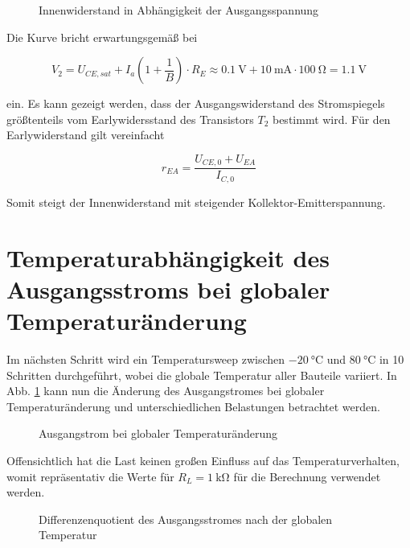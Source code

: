 \begin{figure}[H]
	\centering \small
	\scalebox{0.9}{}
	\caption{Innenwiderstand in Abhängigkeit der Ausgangsspannung}
	\label{fig_Kap4_05:Ri}
\end{figure}

Die Kurve bricht erwartungsgemäß bei 

\begin{equation}
    V_2 = U_{CE,sat} + I_a (1 + \frac{1}{B}) \cdot R_E \approx \SI{0,1}{\volt} + \SI{10}{\milli\ampere} \cdot \SI{100}{\ohm} = \SI{1,1}{\volt}
\end{equation}

ein. Es kann gezeigt werden, dass der Ausgangswiderstand des Stromspiegels größtenteils vom Earlywidersstand des Transistors $T_2$ bestimmt wird. Für den Earlywiderstand gilt vereinfacht

\begin{equation}
    r_{EA} = \frac{U_{CE,0} + U_{EA}}{I_{C,0}}
\end{equation}

Somit steigt der Innenwiderstand mit steigender Kollektor-Emitterspannung.

\section{Temperaturabhängigkeit des Ausgangsstroms bei globaler Temperaturänderung}
Im nächsten Schritt wird ein Temperatursweep zwischen $\SI{-20}{\celsius}$ und $\SI{80}{\celsius}$ in 10 Schritten durchgeführt, wobei die globale Temperatur aller Bauteile variiert. In Abb. \ref{} kann nun die Änderung des Ausgangstromes bei globaler Temperaturänderung und unterschiedlichen Belastungen betrachtet werden. 

\begin{figure}[H]
	\centering \small
	\scalebox{0.9}{}
	\caption{Ausgangstrom bei globaler Temperaturänderung}
	\label{fig_Kap4_06:T_1}
\end{figure}

Offensichtlich hat die Last keinen großen Einfluss auf das Temperaturverhalten, womit repräsentativ die Werte für $R_L = \SI{1}{\kilo\ohm}$ für die Berechnung verwendet werden.

\begin{figure}[H]
	\centering \small
	\scalebox{0.9}{}
	\caption{Differenzenquotient des Ausgangsstromes nach der globalen Temperatur}
	\label{fig_Kap4_07:T_2}
\end{figure}

